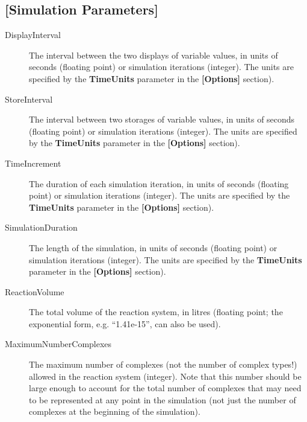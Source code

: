 \subsection{[Simulation Parameters]}
\begin{description}
\item[DisplayInterval] The interval between the two displays of variable values, 
in units of seconds (floating point) or simulation
  iterations (integer).  The units are specified by the
  \textbf{TimeUnits} parameter in the \textbf{[Options]} section).

\item[StoreInterval] The interval between two storages of variable values, 
  in units of seconds (floating point) or simulation iterations
  (integer).  The units are specified by the \textbf{TimeUnits}
  parameter in the \textbf{[Options]} section).
  
\item[TimeIncrement] The duration of each simulation iteration, in
  units of seconds (floating point) or simulation iterations
  (integer).  The units are specified by the \textbf{TimeUnits}
  parameter in the \textbf{[Options]} section).
  
\item[SimulationDuration] The length of the simulation, in units of
  seconds (floating point) or simulation iterations (integer).  The
  units are specified by the \textbf{TimeUnits} parameter in the
  \textbf{[Options]} section).
  
\item[ReactionVolume] The total volume of the reaction system, in
  litres (floating point; the exponential form, e.g. ``1.41e-15'', can
  also be used).
  
\item[MaximumNumberComplexes] The maximum number of complexes (not the
  number of complex types!) allowed in the reaction system (integer).
  Note that this number should be large enough to account for the
  total number of complexes that may need to be represented at any
  point in the simulation (not just the number of complexes at the
  beginning of the simulation).
\end{description}

